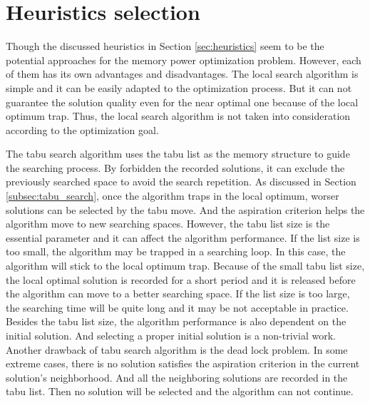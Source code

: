 	\section{Heuristics selection}
	\label{sec:heuristics_selection}
	Though the discussed heuristics in Section \ref{sec:heuristics} seem to
	be the potential approaches for the memory power optimization problem.
	However, each of them has its own advantages and disadvantages.
	The local search algorithm is simple and it can be easily adapted to the
	optimization process. But it can not guarantee the solution quality
	even for the near optimal one because of the local optimum trap. Thus,
	the local search algorithm is not taken into consideration according
	to the optimization goal.
	
	The tabu search algorithm uses the tabu list as the memory structure to
	guide the searching process. By forbidden the recorded solutions, it can
	exclude the previously searched space to avoid the search repetition.
	As discussed in Section \ref{subsec:tabu_search}, once the algorithm
	traps in the local optimum, worser solutions can be selected by the
	tabu move. And the aspiration criterion helps the algorithm move to new
	searching spaces.
	However, the tabu list size is the essential parameter
	and it can affect the algorithm performance. If the list size is too
	small, the algorithm may be trapped in a searching loop. In this case,
	the algorithm will stick to the local optimum trap. Because of the small
	tabu list size, the local optimal solution is recorded for a short
	period and it is released before the algorithm can move to a better
	searching space. If the list size is too large, the searching time will
	be quite long and it may be not acceptable in practice. Besides the tabu
	list size, the algorithm performance is also dependent on the initial
	solution. And selecting a proper initial solution is a non-trivial work.	
	Another drawback of tabu search algorithm is the dead lock problem. In some extreme cases, there is no solution satisfies the aspiration criterion in the current solution's neighborhood. And all the neighboring solutions are recorded in the tabu list. Then no solution will be selected and the algorithm can not continue.
	
